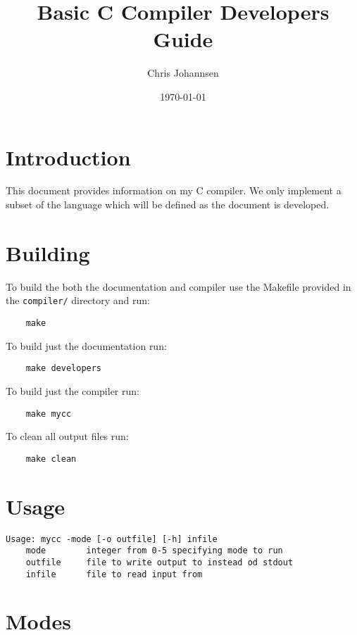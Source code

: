 \documentclass{article}
\title{Basic C Compiler Developers Guide}
\author{Chris Johannsen}
\date{\today}
\begin{document}
\maketitle

\section{Introduction}

This document provides information on my C compiler. We only implement a subset of the language which will be defined as the document is developed.

\section{Building}

To build the both the documentation and compiler use the Makefile provided in the \verb|compiler/| directory and run:

\begin{verbatim}
    make
\end{verbatim}

\noindent To build just the documentation run:

\begin{verbatim}
    make developers
\end{verbatim}

\noindent To build just the compiler run:

\begin{verbatim}
    make mycc
\end{verbatim}

\noindent To clean all output files run:

\begin{verbatim}
    make clean
\end{verbatim}

\section{Usage}

\begin{verbatim}
Usage: mycc -mode [-o outfile] [-h] infile
    mode        integer from 0-5 specifying mode to run
    outfile     file to write output to instead od stdout
    infile      file to read input from
\end{verbatim}

\section{Modes}
\end{document}
